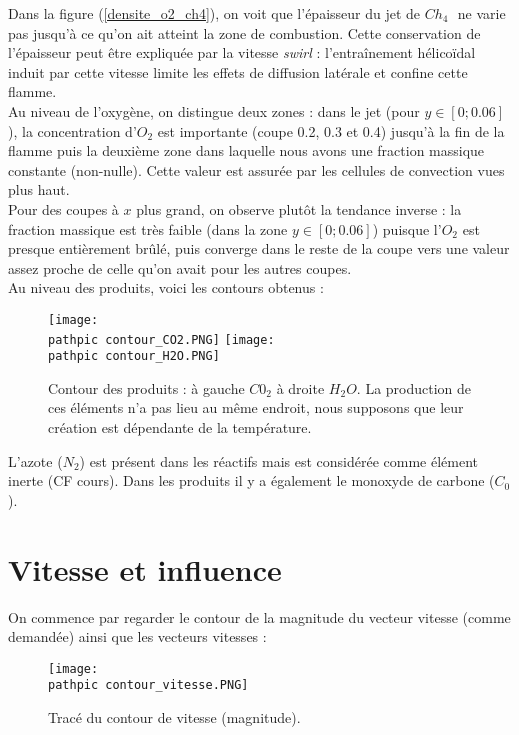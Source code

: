 \documentclass[a4paper,10pt]{article}
\newcommand\pathpic{/home/saura/Documents/Latex_files/Pic/BE_combustion/tp2/}
\newcommand{\chq}{$Ch_4$ }
\begin{document}
Dans la figure (\ref{densite_o2_ch4}), on voit que l'épaisseur du jet de \chq $ $ ne varie pas jusqu'à ce qu'on ait atteint la zone de combustion. Cette conservation de l'épaisseur peut être expliquée par la vitesse \textit{swirl} : l'entraînement hélicoïdal induit par cette vitesse limite les effets de diffusion latérale et confine cette flamme.\\
Au niveau de l'oxygène, on distingue deux zones : dans le jet (pour $y \in [0; 0.06]$), la concentration d'$O_2$ est importante (coupe 0.2, 0.3 et 0.4) jusqu'à la fin de la flamme puis la deuxième zone dans laquelle nous avons une fraction massique constante (non-nulle). Cette valeur est assurée par les cellules de convection vues plus haut.\\
Pour des coupes à $x$ plus grand, on observe plutôt la tendance inverse : la fraction massique est très faible (dans la zone  $y \in [0; 0.06]$) puisque l'$O_2$ est presque entièrement brûlé, puis converge dans le reste de la coupe vers une valeur assez proche de celle qu'on avait pour les autres coupes. \\

\noindent Au niveau des produits, voici les contours obtenus :
\begin{figure}[ht!]
\centering
\texttt{[image: \\pathpic contour\_CO2.PNG]} \hfill
\texttt{[image: \\pathpic contour\_H2O.PNG]}
\caption{Contour des produits : à gauche $C0_2$ à droite $H_2O$. La production de ces éléments n'a pas lieu au même endroit, nous supposons que leur création est dépendante de la température.}
\label{contour_Cod}
\end{figure}

\noindent L'azote ($N_2$) est présent dans les réactifs mais est considérée comme élément inerte (CF cours). Dans les produits il y a également le monoxyde de carbone ($C_0$).

\section{Vitesse et influence}

On commence par regarder le contour de la magnitude du vecteur vitesse (comme demandée) ainsi que les vecteurs vitesses :

\begin{figure}[ht!]
\centering
\texttt{[image: \\pathpic contour\_vitesse.PNG]}
\caption{Tracé du contour de vitesse (magnitude).}
\label{vitesse}
\end{figure} 
\end{document}
